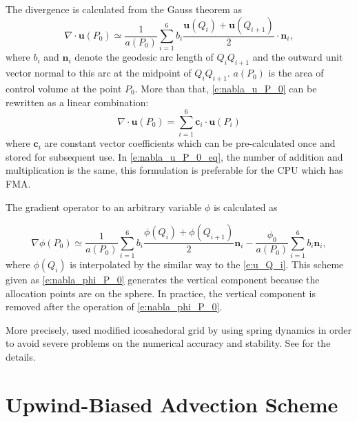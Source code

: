 The divergence is calculated from the Gauss theorem as
%
\begin{equation}
 \nabla \cdot \bm{u}(P_0) \simeq \frac{1}{a(P_0)} %
  \sum^{6}_{i=1} b_i \frac{\bm{u}(Q_i)+\bm{u} (Q_{i+1})}{2} \cdot
  \bm{n}_i,\label{e:nabla_u_P_0}
\end{equation}
%
where $b_i$ and $\bm{n}_i$ denote the geodesic arc length of
$Q_i Q_{i+1}$ and the outward unit vector normal to this arc at the
midpoint of $Q_i Q_{i+1}$.
%
$a(P_0)$ is the area of control volume at the point $P_0$.
%
More than that, \autoref{e:nabla_u_P_0} can be rewritten as a
linear combination:
%
\begin{equation}
 \nabla \cdot \bm{u} (P_0) = \sum^{6}_{i=1} \bm{c}_i \cdot \bm{u}(P_i)\label{e:nabla_u_P_0_eq}
\end{equation}
%
where $\bm{c}_i$ are constant vector coefficients which can be
pre-calculated once and stored for subsequent use.
%
In \autoref{e:nabla_u_P_0_eq}, the number of addition and
multiplication is the same, this formulation is preferable for the CPU
which has FMA.



The gradient operator to an arbitrary variable $\phi$ is calculated as

\begin{equation}
 \nabla \phi(P_0) \simeq
  \frac{1}{a(P_0)}
  \sum^{6}_{i=1} b_i \frac{\phi(Q_i) + \phi(Q_{i+1})}{2} \bm{n}_i
  - \frac{\phi_0}{a(P_0)} \sum^{6}_{i=1} b_i \bm{n}_i,\label{e:nabla_phi_P_0}
\end{equation}
%
where $\phi(Q_i)$ is interpolated by the similar way to the
\autoref{e:u_Q_i}.
%
This scheme given as \autoref{e:nabla_phi_P_0} generates the
vertical component because the allocation points are on the sphere.
%
In practice, the vertical component is removed after the operation of
\autoref{e:nabla_phi_P_0}.


More precisely, \NICAM used modified icosahedoral grid by using spring dynamics in order to avoid
severe problems on the numerical accuracy and stability.
See \cite{Tomita:2001id} for the details.
%


\section{Upwind-Biased Advection Scheme}\label{s:upwind_scheme}

